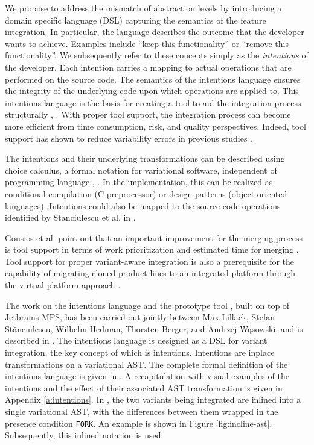 We propose to address the mismatch of abstraction levels by introducing a domain specific language (DSL) capturing the semantics of the feature integration. In particular, the language describes the outcome that the developer wants to achieve. Examples include ``keep this functionality'' or ``remove this functionality''. We subsequently refer to these concepts simply as the \textit{intentions} of the developer. Each intention carries a mapping to actual operations that are performed on the source code. The semantics of the intentions language ensures the integrity of the underlying code upon which operations are applied to. This intentions language is the basis for creating a tool to aid the integration process structurally \cite{mens2002}, \cite{apel2011}. With proper tool support, the integration process can become more efficient from time consumption, risk, and quality perspectives. Indeed, tool support has shown to reduce variability errors in previous studies \cite{ribeiro2014emergent}.

The intentions and their underlying transformations can be described using choice calculus, a formal notation for variational software, independent of programming language \cite{erwig2011choice}, \cite{walkingshaw2012choice}. In the implementation, this can be realized as conditional compilation (C preprocessor) or design patterns  (object-oriented languages). Intentions could also be mapped to the source-code operations identified by Stanciulescu et al. in \cite{stanciulescu2016concepts}.

Gousios et al. point out that an important improvement for the merging process is tool support in terms of work prioritization and estimated time for merging \cite{gousios2015}. Tool support for proper variant-aware integration is also a prerequisite for the capability of migrating cloned product lines to an integrated platform through the virtual platform approach \cite{antkiewicz2014flexible}.

The work on the intentions language and the prototype tool \tooln, built on top of Jetbrains MPS, has been carried out jointly between Max Lillack, Ștefan St\u{a}nciulescu, Wilhelm Hedman, Thorsten Berger, and Andrzej W\k{a}sowski, and is described in \cite{lillack2017intentions}. The intentions language is designed as a DSL for variant integration, the key concept of which is intentions. Intentions are inplace transformations on a variational AST. The complete formal definition of the intentions language is given in \cite{lillack2017intentions}. A recapitulation with visual examples of the intentions and the effect of their associated AST transformation is given in Appendix \ref{a:intentions}. In \tooln, the two variants being integrated are inlined into a single variational AST, with the differences between them wrapped in the presence condition \texttt{FORK}. An example is shown in Figure \ref{fig:incline-ast}. Subsequently, this inlined notation is used.


